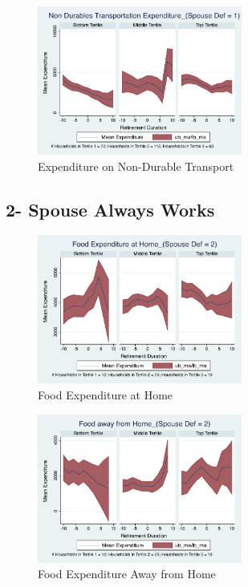 \documentclass[11pt,onecolumn]{article}
\begin{document}
\begin{figure}[h]
	\caption{Expenditure on Non-Durable Transport}
	\centering
	\includegraphics[width=0.6\textwidth]{../ConsumptionPostRetirement_by_SpouseDef_Cats/Smoothed/1/spouse_def_total_transport_real.pdf}
\end{figure}
\clearpage

\subsection{2- Spouse Always Works}

\begin{figure}[h]
	\caption{Food Expenditure at Home}
	\centering
	\includegraphics[width=0.6\textwidth]{../ConsumptionPostRetirement_by_SpouseDef_Cats/Smoothed/2/spouse_def_total_foodexp_home_real.pdf}
\end{figure}


\begin{figure}[h]
	\caption{Food Expenditure Away from Home}
	\centering
	\includegraphics[width=0.6\textwidth]{../ConsumptionPostRetirement_by_SpouseDef_Cats/Smoothed/2/spouse_def_total_foodexp_away_real.pdf}
\end{figure}
\end{document}
